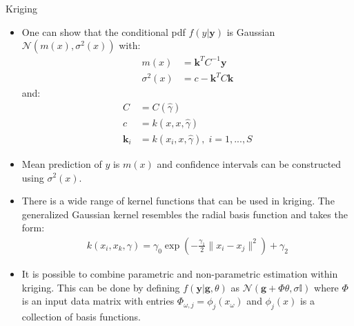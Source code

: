 \documentclass[9pt]{beamer}
\begin{document}
\begin{frame}{Kriging}

\begin{itemize}
 
\item One can show that the conditional pdf $f(y|\mathbf{y})$ is Gaussian $\mathcal{N}(m(x),\sigma^2(x))$ with:
\begin{align*}
m(x)&=\mathbf{k}^TC^{-1}\mathbf{y}\\
\sigma^2(x)&=c-\mathbf{k}^TC\mathbf{k}
\end{align*}
and:
\begin{align*}
C&=C(\hat{\gamma})\\
c&=k(x,x,\hat{\gamma})\\
\mathbf{k}_i&=k(x_i,x,\hat{\gamma}),\; i=1,...,S
\end{align*}
\item Mean prediction of $y$ is $m(x)$ and confidence intervals can be constructed using $\sigma^2(x)$.
\item There is a wide range of kernel functions that can be used in kriging. The generalized Gaussian kernel resembles the radial basis function and takes the form:
\begin{align*}
k(x_i,x_k,\gamma)=\gamma_0\exp\left(-\frac{\gamma_1}{2}\|x_i-x_j\|^2\right)+\gamma_2
\end{align*}
\item It is possible to combine parametric and non-parametric estimation within kriging. This can be done by defining $f(\mathbf{y}|\mathbf{g},\theta)$ as $\mathcal{N}(\mathbf{g}+\Phi\theta,\sigma \mathbb{I})$ where $\Phi$ is an input data matrix with entries $\Phi_{\omega,j}=\phi_j(x_\omega)$ and $\phi_j(x)$ is a collection of basis functions. 

\end{itemize}

\end{frame}
\end{document}
